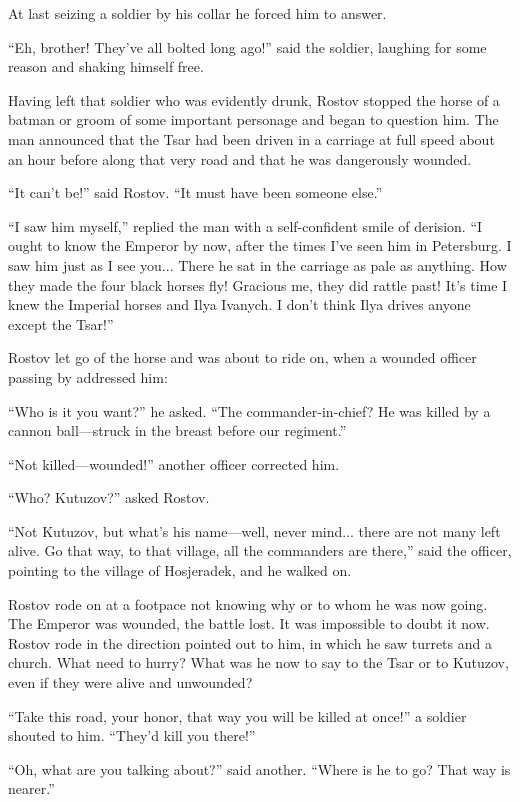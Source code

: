 At last seizing a soldier by his collar he forced him to answer.

``Eh, brother! They've all bolted long ago!'' said the soldier,
laughing for some reason and shaking himself free.

Having left that soldier who was evidently drunk, Rostov stopped
the horse of a batman or groom of some important personage and
began to question him. The man announced that the Tsar had been
driven in a carriage at full speed about an hour before along
that very road and that he was dangerously wounded.

``It can't be!'' said Rostov. ``It must have been someone else.''

``I saw him myself,'' replied the man with a self-confident smile
of derision. ``I ought to know the Emperor by now, after the
times I've seen him in Petersburg. I saw him just as I see
you... There he sat in the carriage as pale as anything. How they
made the four black horses fly!  Gracious me, they did rattle
past! It's time I knew the Imperial horses and Ilya Ivanych. I
don't think Ilya drives anyone except the Tsar!''

Rostov let go of the horse and was about to ride on, when a
wounded officer passing by addressed him:

``Who is it you want?'' he asked. ``The commander-in-chief? He
was killed by a cannon ball---struck in the breast before our
regiment.''

``Not killed---wounded!'' another officer corrected him.

``Who? Kutuzov?'' asked Rostov.

``Not Kutuzov, but what's his name---well, never mind... there
are not many left alive. Go that way, to that village, all the
commanders are there,'' said the officer, pointing to the village
of Hosjeradek, and he walked on.

Rostov rode on at a footpace not knowing why or to whom he was
now going. The Emperor was wounded, the battle lost. It was
impossible to doubt it now. Rostov rode in the direction pointed
out to him, in which he saw turrets and a church. What need to
hurry? What was he now to say to the Tsar or to Kutuzov, even if
they were alive and unwounded?

``Take this road, your honor, that way you will be killed at
once!'' a soldier shouted to him. ``They'd kill you there!''

``Oh, what are you talking about?'' said another. ``Where is he
to go? That way is nearer.''


